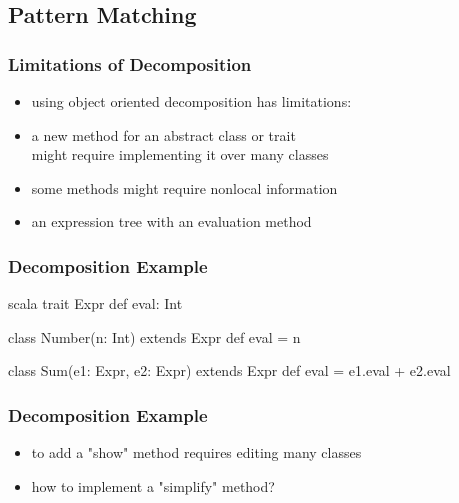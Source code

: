 \documentclass[dvipsnames]{beamer}
\theoremstyle{plain}
\begin{document}
\subsection{Pattern Matching}

\begin{frame}
  \frametitle{Limitations of Decomposition}

  \begin{itemize}
    \item using object oriented decomposition has limitations:
    \item a new method for an abstract class or trait\\
      might require implementing it over many classes
    \item some methods might require nonlocal information
  \end{itemize}

  \pause
  \begin{example}[Scala]
    \begin{itemize}
      \item an expression tree with an evaluation method
    \end{itemize}
  \end{example}
\end{frame}

\begin{frame}[fragile]
  \frametitle{Decomposition Example}

  \begin{example}[Scala]
    \begin{pygments}{scala}
trait Expr {
    def eval: Int
}

class Number(n: Int) extends Expr {
    def eval = n
}

class Sum(e1: Expr, e2: Expr) extends Expr {
    def eval = e1.eval + e2.eval
}
    \end{pygments}
  \end{example}
\end{frame}

\begin{frame}
  \frametitle{Decomposition Example}

  \begin{example}[Scala]
    \begin{itemize}
      \item to add a "show" method requires editing many classes
      \item how to implement a "simplify" method?
    \end{itemize}
  \end{example}
\end{frame}
\end{document}
